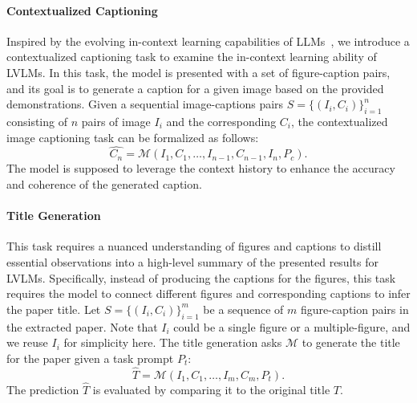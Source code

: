 \paragraph{Contextualized Captioning}
Inspired by the evolving in-context learning capabilities of LLMs~\citep{brown2020language,icl_survey}, we introduce a contextualized captioning task to examine the in-context learning ability of LVLMs. 
In this task, the model is presented with a set of figure-caption pairs, and its goal is to generate a caption for a given image based on the provided demonstrations.
Given a sequential image-captions pairs $S = \{ ( I_i, C_i)  \}_{i=1}^n$ consisting of $n$ pairs of image $I_i$ and the corresponding $C_i$, the contextualized image captioning task can be formalized as follows:
\begin{equation*}
    \hat{C_n} = \mathcal{M} ( I_1, C_1, \ldots, I_{n-1}, C_{n-1}, I_n, P_c).
\end{equation*}
The model is supposed to leverage the context history to enhance the accuracy and coherence of the generated caption.

\paragraph{Title Generation}
This task requires a nuanced understanding of figures and captions to distill essential observations into a high-level summary of the presented results for LVLMs.
Specifically, instead of producing the captions for the figures, this task requires the model to connect different figures and corresponding captions to infer the paper title.
Let $S = \{ (I_i, C_i) \}_{i=1}^m$ be a sequence of $m$ figure-caption pairs in the extracted paper. 
Note that $I_i$ could be a single figure or a multiple-figure, and we reuse $I_i$ for simplicity here.
The title generation asks $\mathcal{M}$ to generate the title for the paper given a task prompt $P_t$:
\begin{equation*}
   \hat{T} = \mathcal{M} ( I_1, C_1, \ldots, I_{m}, C_m, P_t ) .
\end{equation*}
The prediction $\hat{T}$ is evaluated by comparing it to the original title $T$.




